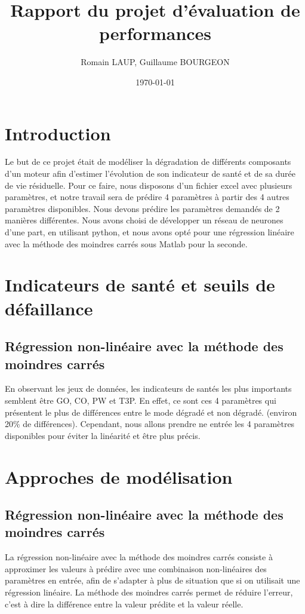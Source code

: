 \documentclass[12pt]{article}
\title{Rapport du projet d'évaluation de performances}
\author{Romain LAUP, Guillaume BOURGEON}
\date{\today}
\begin{document}
\maketitle

\section{Introduction}
Le but de ce projet était de modéliser la dégradation de différents composants d'un moteur afin d'estimer l'évolution de son indicateur de santé et de sa durée de vie résiduelle. Pour ce faire, nous disposons d'un fichier excel avec plusieurs paramètres, et notre travail sera de prédire 4 paramètres à partir des 4 autres paramètres disponibles. Nous devons prédire les paramètres demandés de 2 manières différentes. Nous avons choisi de développer un réseau de neurones d'une part, en utilisant python, et nous avons opté pour une régression linéaire avec la méthode des moindres carrés sous Matlab pour la seconde.

\section{Indicateurs de santé et seuils de défaillance}
\subsection{Régression non-linéaire avec la méthode des moindres carrés}
En observant les jeux de données, les indicateurs de santés les plus importants semblent être GO, CO, PW et T3P. En effet, ce sont ces 4 paramètres qui présentent le plus de différences entre le mode dégradé et non dégradé. (environ 20\% de différences). Cependant, nous allons prendre ne entrée les 4 paramètres disponibles pour éviter la linéarité et être plus précis.

\section{Approches de modélisation}
\subsection{Régression non-linéaire avec la méthode des moindres carrés}
La régression non-linéaire avec la méthode des moindres carrés consiste à approximer les valeurs à prédire avec une combinaison non-linéaires des paramètres en entrée, afin de s'adapter à plus de situation que si on utilisait une régression linéaire. La méthode des moindres carrés permet de réduire l'erreur, c'est à dire la différence entre la valeur prédite et la valeur réelle.
\end{document}
